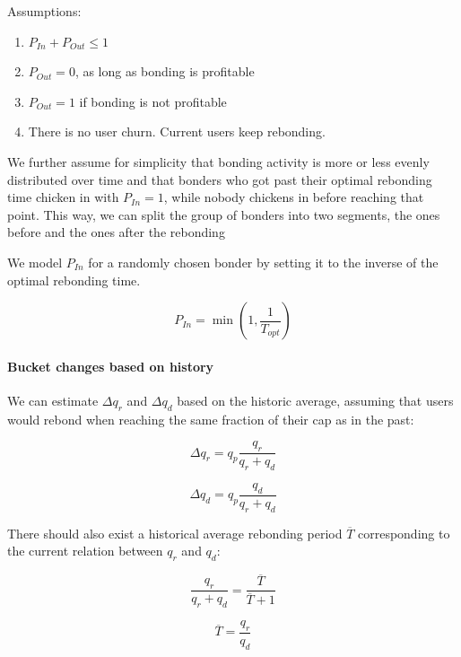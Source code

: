 \documentclass{article}
\begin{document}
Assumptions:

\begin{enumerate}
	\item $P_{In} + P_{Out} \leq 1$
	\item $P_{Out} = 0$, as long as bonding is profitable
	\item $P_{Out} = 1$ if bonding is not profitable
	\item There is no user churn. Current users keep rebonding.
\end{enumerate}

We further assume for simplicity that bonding activity is more or less evenly distributed over time and that bonders who got past their optimal rebonding time chicken in with $P_{In}=1$, while nobody chickens in before reaching that point.
This way, we can split the group of bonders into two segments, the ones before and the ones after the rebonding

We model $P_{In}$ for a randomly chosen bonder by setting it to the inverse of the optimal rebonding time.

\begin{equation}
    P_{In} = \min \left(1,\frac{1}{T_{opt}}\right)
\end{equation} 

\paragraph{Bucket changes based on history}
We can estimate $\Delta q_{r}$ and $\Delta q_{d}$ based on the historic average, assuming that users would rebond when reaching the same fraction of their cap as in the past:

\begin{equation}
\Delta q_{r} = q_{p} \frac{q_{r}}{q_{r}+q_{d}}
\end{equation}

\begin{equation}
\Delta q_{d} = q_{p} \frac{q_{d}}{q_{r}+q_{d}}
\end{equation}

There should also exist a historical average rebonding period $\overline{T}$ corresponding to the current relation between $q_r$ and $q_d$:

\begin{equation}
    \frac{q_{r}}{q_{r}+q_{d}} = \frac{\overline{T}}{\overline{T}+1}
\end{equation}

\begin{equation}
    \overline{T} = \frac{q_{r}}{q_{d}}
\end{equation}
\end{document}

